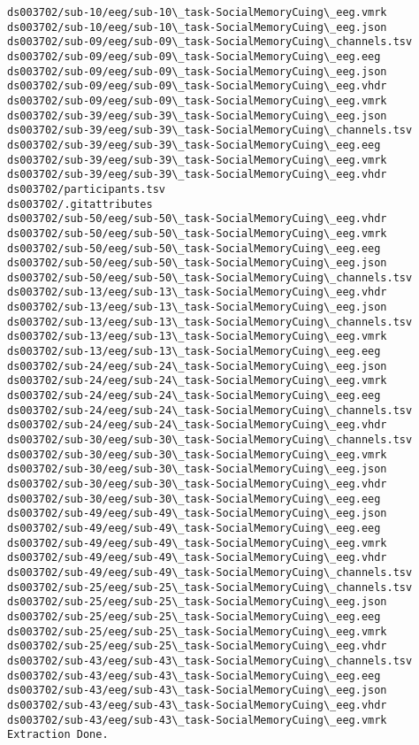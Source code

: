 \documentclass[11pt]{article}
\begin{document}
\begin{Verbatim}[commandchars=\\\{\}]
ds003702/sub-10/eeg/sub-10\_task-SocialMemoryCuing\_eeg.vmrk
ds003702/sub-10/eeg/sub-10\_task-SocialMemoryCuing\_eeg.json
ds003702/sub-09/eeg/sub-09\_task-SocialMemoryCuing\_channels.tsv
ds003702/sub-09/eeg/sub-09\_task-SocialMemoryCuing\_eeg.eeg
ds003702/sub-09/eeg/sub-09\_task-SocialMemoryCuing\_eeg.json
ds003702/sub-09/eeg/sub-09\_task-SocialMemoryCuing\_eeg.vhdr
ds003702/sub-09/eeg/sub-09\_task-SocialMemoryCuing\_eeg.vmrk
ds003702/sub-39/eeg/sub-39\_task-SocialMemoryCuing\_eeg.json
ds003702/sub-39/eeg/sub-39\_task-SocialMemoryCuing\_channels.tsv
ds003702/sub-39/eeg/sub-39\_task-SocialMemoryCuing\_eeg.eeg
ds003702/sub-39/eeg/sub-39\_task-SocialMemoryCuing\_eeg.vmrk
ds003702/sub-39/eeg/sub-39\_task-SocialMemoryCuing\_eeg.vhdr
ds003702/participants.tsv
ds003702/.gitattributes
ds003702/sub-50/eeg/sub-50\_task-SocialMemoryCuing\_eeg.vhdr
ds003702/sub-50/eeg/sub-50\_task-SocialMemoryCuing\_eeg.vmrk
ds003702/sub-50/eeg/sub-50\_task-SocialMemoryCuing\_eeg.eeg
ds003702/sub-50/eeg/sub-50\_task-SocialMemoryCuing\_eeg.json
ds003702/sub-50/eeg/sub-50\_task-SocialMemoryCuing\_channels.tsv
ds003702/sub-13/eeg/sub-13\_task-SocialMemoryCuing\_eeg.vhdr
ds003702/sub-13/eeg/sub-13\_task-SocialMemoryCuing\_eeg.json
ds003702/sub-13/eeg/sub-13\_task-SocialMemoryCuing\_channels.tsv
ds003702/sub-13/eeg/sub-13\_task-SocialMemoryCuing\_eeg.vmrk
ds003702/sub-13/eeg/sub-13\_task-SocialMemoryCuing\_eeg.eeg
ds003702/sub-24/eeg/sub-24\_task-SocialMemoryCuing\_eeg.json
ds003702/sub-24/eeg/sub-24\_task-SocialMemoryCuing\_eeg.vmrk
ds003702/sub-24/eeg/sub-24\_task-SocialMemoryCuing\_eeg.eeg
ds003702/sub-24/eeg/sub-24\_task-SocialMemoryCuing\_channels.tsv
ds003702/sub-24/eeg/sub-24\_task-SocialMemoryCuing\_eeg.vhdr
ds003702/sub-30/eeg/sub-30\_task-SocialMemoryCuing\_channels.tsv
ds003702/sub-30/eeg/sub-30\_task-SocialMemoryCuing\_eeg.vmrk
ds003702/sub-30/eeg/sub-30\_task-SocialMemoryCuing\_eeg.json
ds003702/sub-30/eeg/sub-30\_task-SocialMemoryCuing\_eeg.vhdr
ds003702/sub-30/eeg/sub-30\_task-SocialMemoryCuing\_eeg.eeg
ds003702/sub-49/eeg/sub-49\_task-SocialMemoryCuing\_eeg.json
ds003702/sub-49/eeg/sub-49\_task-SocialMemoryCuing\_eeg.eeg
ds003702/sub-49/eeg/sub-49\_task-SocialMemoryCuing\_eeg.vmrk
ds003702/sub-49/eeg/sub-49\_task-SocialMemoryCuing\_eeg.vhdr
ds003702/sub-49/eeg/sub-49\_task-SocialMemoryCuing\_channels.tsv
ds003702/sub-25/eeg/sub-25\_task-SocialMemoryCuing\_channels.tsv
ds003702/sub-25/eeg/sub-25\_task-SocialMemoryCuing\_eeg.json
ds003702/sub-25/eeg/sub-25\_task-SocialMemoryCuing\_eeg.eeg
ds003702/sub-25/eeg/sub-25\_task-SocialMemoryCuing\_eeg.vmrk
ds003702/sub-25/eeg/sub-25\_task-SocialMemoryCuing\_eeg.vhdr
ds003702/sub-43/eeg/sub-43\_task-SocialMemoryCuing\_channels.tsv
ds003702/sub-43/eeg/sub-43\_task-SocialMemoryCuing\_eeg.eeg
ds003702/sub-43/eeg/sub-43\_task-SocialMemoryCuing\_eeg.json
ds003702/sub-43/eeg/sub-43\_task-SocialMemoryCuing\_eeg.vhdr
ds003702/sub-43/eeg/sub-43\_task-SocialMemoryCuing\_eeg.vmrk
Extraction Done.
    \end{Verbatim}
\end{document}
